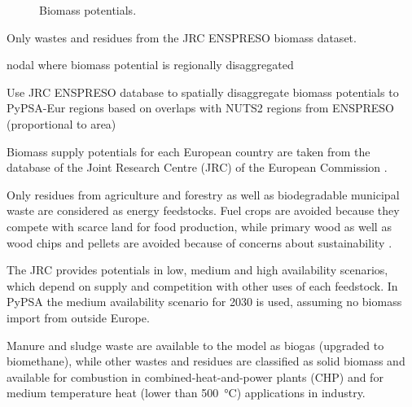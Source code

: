 \begin{figure}
    \centering
    \caption{Biomass potentials.}
    \label{fig:biomass-potentials}
\end{figure}

Only wastes and residues from the JRC ENSPRESO biomass dataset.

nodal where biomass potential is regionally disaggregated

Use JRC ENSPRESO database to spatially disaggregate biomass potentials to
PyPSA-Eur regions based on overlaps with NUTS2 regions from ENSPRESO
(proportional to area)

Biomass supply potentials for each European country are taken from the database
of the Joint Research Centre (JRC) of the European Commission
.

Only residues from agriculture and forestry as well as
biodegradable municipal waste are considered as energy feedstocks. Fuel crops
are avoided because they compete with scarce land for food production, while
primary wood as well as wood chips and pellets are avoided because of concerns
about sustainability .

The JRC provides potentials in low,
medium and high availability scenarios, which depend on supply and competition
with other uses of each feedstock. In PyPSA the medium availability scenario for
2030 is used, assuming no biomass import from outside Europe.

Manure and sludge waste are available to the model as biogas (upgraded to
biomethane), while other wastes and residues are classified as solid biomass and
available for combustion in combined-heat-and-power plants (CHP) and for medium
temperature heat (lower than \SI{500}{\celsius}) applications in industry.

